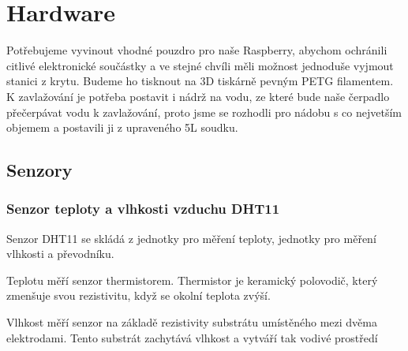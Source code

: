 \documentclass[12pt,a4paper]{article}
\begin{document}
\begin{acronym}
\end{acronym}

\clearpage

\section{Hardware}

Potřebujeme vyvinout vhodné pouzdro pro naše Raspberry, abychom ochránili
citlivé elektronické součástky a ve stejné chvíli měli možnost jednoduše
vyjmout stanici z krytu. Budeme ho tisknout na 3D tiskárně pevným \ac{PETG}
filamentem. K
zavlažování je potřeba postavit i nádrž na vodu, ze které bude naše čerpadlo
přečerpávat vodu k zavlažování, proto jsme se rozhodli pro nádobu s co
nejvetším objemem a postavili ji z upraveného 5L soudku.

\subsection{Senzory}

\subsubsection{Senzor teploty a vlhkosti vzduchu DHT11}

Senzor \ac{DHT11} se skládá z jednotky pro měření teploty, jednotky pro měření
vlhkosti a převodníku.

Teplotu měří senzor thermistorem. Thermistor je keramický polovodič, který
zmenšuje svou rezistivitu, když se okolní teplota zvýší.

Vlhkost měří senzor na základě rezistivity substrátu umístěného mezi dvěma
elektrodami. Tento substrát zachytává vlhkost a vytváří tak vodivé prostředí
\end{document}
